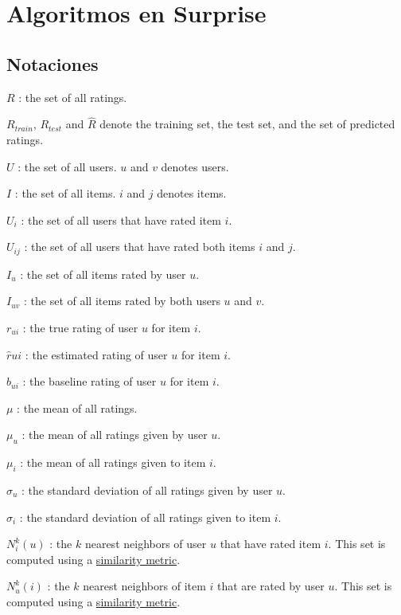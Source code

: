 \documentclass{article}
\begin{document}
\newpage
\printbibliography

\newpage
\appendix
\section{Algoritmos en Surprise}
\label{appendix:a}

\subsection{Notaciones}

$R$ : the set of all ratings.

$R_{train}$, $R_{test}$ and $\hat{R}$ denote the training set, the test set, and the set of predicted ratings.

$U$ : the set of all users. $u$ and $v$ denotes users.

$I$ : the set of all items. $i$ and $j$ denotes items.

$U_i$ : the set of all users that have rated item $i$.

$U_{ij}$ : the set of all users that have rated both items $i$ and $j$.

$I_u$ : the set of all items rated by user $u$.

$I_{uv}$ : the set of all items rated by both users $u$ and $v$.

$r_{ui}$ : the true rating of user $u$ for item $i$.

$\hat{r}{ui}$ : the estimated rating of user $u$ for item $i$.

$b_{ui}$ : the baseline rating of user $u$ for item $i$.

$\mu$ : the mean of all ratings.

$\mu_u$ : the mean of all ratings given by user $u$.

$\mu_i$ : the mean of all ratings given to item $i$.

$\sigma_u$ : the standard deviation of all ratings given by user $u$.

$\sigma_i$ : the standard deviation of all ratings given to item $i$.

$N_i^k(u)$ : the $k$ nearest neighbors of user $u$ that have rated item $i$. This set is computed using a \href{https://surprise.readthedocs.io/en/stable/similarities.html#module-surprise.similarities}{similarity metric}.

$N_u^k(i)$ : the $k$ nearest neighbors of item $i$ that are rated by user $u$. This set is computed using a \href{https://surprise.readthedocs.io/en/stable/similarities.html#module-surprise.similarities}{similarity metric}.\\
\\
\end{document}
